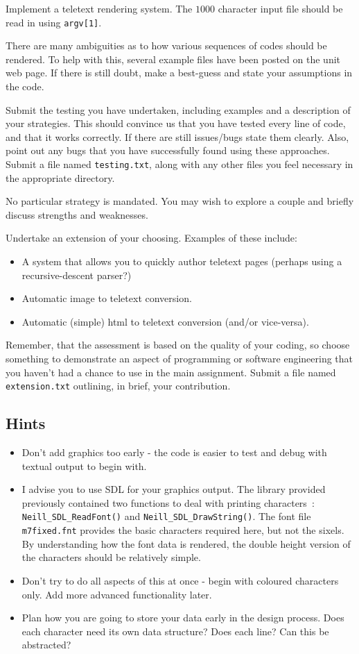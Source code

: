 \begin{exercise}
Implement a teletext rendering system. The $1000$ character input
file should be read in using \verb^argv[1]^.

There are many ambiguities
as to how various sequences of codes should be rendered. To help with
this, several example files have been posted on the unit web page. 
If there is still doubt, make a best-guess and state your assumptions
in the code.

Submit the testing you have undertaken, including examples and a description
of your strategies. This should convince us that you have tested every line
of code, and that it works correctly. If there are still issues/bugs state
them clearly. Also, point out any bugs that you have successfully found using
these approaches. Submit a file named \verb^testing.txt^, along with any other
files you feel necessary in the appropriate directory.

No particular strategy is mandated. You may wish to explore a couple and briefly
discuss strengths and weaknesses. 

Undertake an extension of your choosing. Examples of these include:
\begin{itemize}
\item A system that allows you to quickly author teletext pages (perhaps
using a recursive-descent parser?)
\item Automatic image to teletext conversion.
\item Automatic (simple) html to teletext conversion (and/or vice-versa).
\end{itemize}
Remember, that the assessment is based on the quality of your coding, so choose
something to demonstrate an aspect of programming or software engineering
that you haven't had a chance to use in the main assignment. Submit a file named
\verb^extension.txt^ outlining, in brief, your contribution. 

\subsection*{Hints}

\begin{itemize}
\item Don't add graphics too early - the
code is easier to test and debug with textual output to begin with.
\item I advise you to use SDL for your graphics output. The library provided previously contained
two functions to deal with printing characters~: \verb^Neill_SDL_ReadFont()^ and
\verb^Neill_SDL_DrawString()^. The font file \verb^m7fixed.fnt^ provides the basic
characters required here, but not the sixels. By understanding how the font data
is rendered, the double height version of the characters should be relatively simple.
\item Don't try to do all aspects of this at once - begin with coloured characters only. Add more
advanced functionality later.
\item Plan how you are going to store your data early in the design process.
Does each character need its own data structure? Does each line? Can this be abstracted?
\end{itemize}


\end{exercise}
